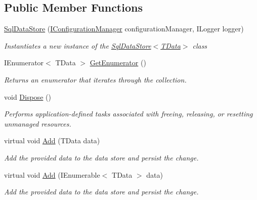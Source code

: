 \subsection*{Public Member Functions}
\begin{DoxyCompactItemize}
\item 
\hyperlink{classCqrs_1_1DataStores_1_1SqlDataStore_a0ce9b3f74799e463d4f53eda386d5577}{Sql\+Data\+Store} (\hyperlink{interfaceCqrs_1_1Configuration_1_1IConfigurationManager}{I\+Configuration\+Manager} configuration\+Manager, I\+Logger logger)
\begin{DoxyCompactList}\small\item\em Instantiates a new instance of the \hyperlink{classCqrs_1_1DataStores_1_1SqlDataStore_a0ce9b3f74799e463d4f53eda386d5577}{Sql\+Data\+Store$<$\+T\+Data$>$} class \end{DoxyCompactList}\item 
I\+Enumerator$<$ T\+Data $>$ \hyperlink{classCqrs_1_1DataStores_1_1SqlDataStore_a774a0a12d6a89479cf25191916f51c47}{Get\+Enumerator} ()
\begin{DoxyCompactList}\small\item\em Returns an enumerator that iterates through the collection. \end{DoxyCompactList}\item 
void \hyperlink{classCqrs_1_1DataStores_1_1SqlDataStore_a975c0087677987dffccc4f0ffa97e691}{Dispose} ()
\begin{DoxyCompactList}\small\item\em Performs application-\/defined tasks associated with freeing, releasing, or resetting unmanaged resources. \end{DoxyCompactList}\item 
virtual void \hyperlink{classCqrs_1_1DataStores_1_1SqlDataStore_abcca53d2e93dbdfb193a9fb0996849c5}{Add} (T\+Data data)
\begin{DoxyCompactList}\small\item\em Add the provided {\itshape data}  to the data store and persist the change. \end{DoxyCompactList}\item 
virtual void \hyperlink{classCqrs_1_1DataStores_1_1SqlDataStore_a45aa105f2571510223c6073804690487}{Add} (I\+Enumerable$<$ T\+Data $>$ data)
\begin{DoxyCompactList}\small\item\em Add the provided {\itshape data}  to the data store and persist the change. \end{DoxyCompactList}\item 

\end{DoxyCompactItemize}

